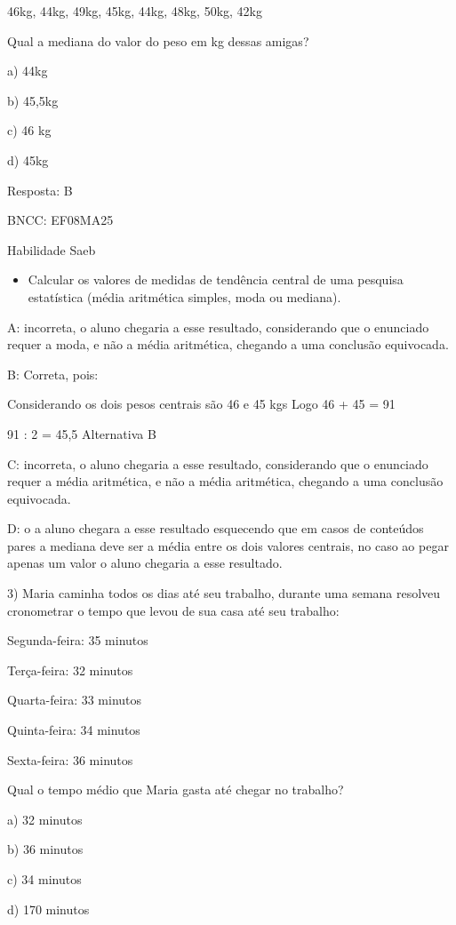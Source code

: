 46kg, 44kg, 49kg, 45kg, 44kg, 48kg, 50kg, 42kg

Qual a mediana do valor do peso em kg dessas amigas?

a) 44kg

b) 45,5kg

c) 46 kg

d) 45kg

Resposta: B

BNCC: EF08MA25

Habilidade Saeb

\begin{itemize}
\tightlist
\item
  Calcular os valores de medidas de tendência central de uma pesquisa
  estatística (média aritmética simples, moda ou mediana).
\end{itemize}

A: incorreta, o aluno chegaria a esse resultado, considerando que o
enunciado requer a moda, e não a média aritmética, chegando a uma
conclusão equivocada.

B: Correta, pois:

Considerando os dois pesos centrais são 46 e 45 kgs Logo 46 + 45 = 91

91 : 2 = 45,5 Alternativa B

C: incorreta, o aluno chegaria a esse resultado, considerando que o
enunciado requer a média aritmética, e não a média aritmética, chegando
a uma conclusão equivocada.

D: o a aluno chegara a esse resultado esquecendo que em casos de
conteúdos pares a mediana deve ser a média entre os dois valores
centrais, no caso ao pegar apenas um valor o aluno chegaria a esse
resultado.

3) Maria caminha todos os dias até seu trabalho, durante uma semana
resolveu cronometrar o tempo que levou de sua casa até seu trabalho:

Segunda-feira: 35 minutos

Terça-feira: 32 minutos

Quarta-feira: 33 minutos

Quinta-feira: 34 minutos

Sexta-feira: 36 minutos

Qual o tempo médio que Maria gasta até chegar no trabalho?

a) 32 minutos

b) 36 minutos

c) 34 minutos

d) 170 minutos

